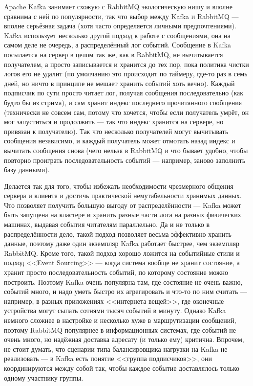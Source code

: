 \documentclass{../../text-style}
\begin{document}
Apache Kafka занимает схожую с RabbitMQ экологическую нишу и вполне сравнима с ней по популярности, так что выбор между Kafka и RabbitMQ --- вполне серьёзная задача (хотя часто определяется личными предпочтениями). Kafka использует несколько другой подход к работе с сообщениями, она на самом деле не очередь, а распределённый лог событий. Сообщение в Kafka посылается на сервер в целом так же, как в RabbitMQ, не вычитывается получателем, а просто записывается и хранится до тех пор, пока политика чистки логов его не удалит (по умолчанию это происходит по таймеру, где-то раз в семь дней, но ничто в принципе не мешает хранить событий хоть вечно). Каждый подписчик по сути просто читает лог, получая сообщения последовательно (как будто бы из стрима), и сам хранит индекс последнего прочитанного сообщения (технически не совсем сам, потому что хочется, чтобы если получатель умрёт, он мог запуститься и продолжить --- так что индекс хранится на сервере, но привязан к получателю). Так что несколько получателей могут вычитывать сообщения независимо, и каждый получатель может отмотать назад индекс и вычитать сообщения снова (чего нельзя в RabbitMQ и что бывает удобно, чтобы повторно проиграть последовательность событий --- например, заново заполнить базу данными).

Делается так для того, чтобы избежать необходимости чрезмерного общения сервера и клиента и достичь практической немутабельности хранимых данных. Что позволяет получить большую выгоду от распределённости --- Kafka может быть запущена на кластере и хранить разные части лога на разных физических машинах, выдавая события читателям параллельно. Да и не только в распределённости дело, такой подход позволяет весьма эффективно хранить данные, поэтому даже один экземпляр Kafka работает быстрее, чем экземпляр RabbitMQ. Кроме того, такой подход хорошо ложится на событийные стили и подход <<Event Sourcing>> --- когда система вообще не хранит состояние, а хранит просто последовательность событий, по которому состояние можно построить. Поэтому Kafka очень популярна там, где состояние не очень важно, событий много, и надо уметь быстро их агрегировать и что-то по ним считать --- например, в разных приложениях <<интернета вещей>>, где оконечные устройства могут сыпать сотнями тысяч событий в минуту. Однако Kafka немного сложнее в настройке и несколько хуже в маршрутизации сообщений, поэтому RabbitMQ популярнее в информационных системах, где событий не очень много, но надёжная доставка адресату (и только ему) критична. Впрочем, не стоит думать, что сценарии типа балансировщика нагрузки на Kafka не реализовать --- в Kafka есть понятие <<группа подписчиков>>, они координируются между собой так, чтобы каждое событие доставлялось только одному участнику группы.
\end{document}
